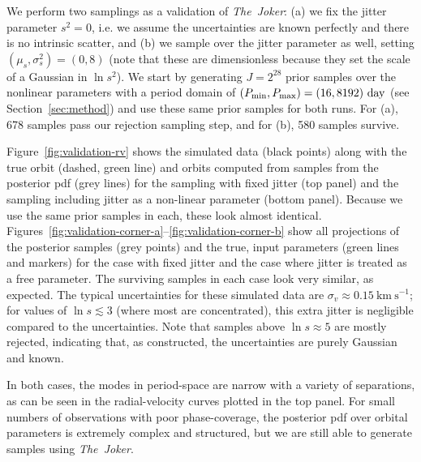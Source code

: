 \documentclass[manuscript, letterpaper]{aastex6}
\newcommand{\project}[1]{\textsl{#1}}
\newcommand{\samplername}{\project{The~Joker}}
\newcommand{\sectionname}{Section}
\newcommand{\figname}{Figure}
\newcommand{\kms}{\mathrm{km}~\mathrm{s}^{-1}}
\begin{document}
We perform two samplings as a validation of \samplername:
(a) we fix the jitter parameter $s^2 = 0$, i.e. we assume the uncertainties are
known perfectly and there is no intrinsic scatter, and (b) we sample over the
jitter parameter as well, setting $(\mu_s,\sigma^2_s) = (0,8)$ (note that these
are dimensionless because they set the scale of a Gaussian in $\ln s^2$).
We start by generating $J=2^{28}$ prior samples over the nonlinear parameters
with a period domain of $(P_{\rm min}, P_{\rm max}) = (16, 8192)~{\rm day}$ (see
\sectionname~\ref{sec:method}) and use these same prior samples for both runs.
For (a), 678 samples pass our rejection sampling step, and for (b), 580 samples
survive.

\figname~\ref{fig:validation-rv} shows the simulated data (black points) along with
the true orbit (dashed, green line) and orbits computed from samples from the
posterior pdf (grey lines) for the sampling with fixed jitter (top panel) and
the sampling including jitter as a non-linear parameter (bottom panel).
Because we use the same prior samples in each, these look almost identical.
\figname s~\ref{fig:validation-corner-a}--\ref{fig:validation-corner-b} show all
projections of the posterior samples (grey points) and the true, input
parameters (green lines and markers) for the case with fixed jitter and the case
where jitter is treated as a free parameter.
The surviving samples in each case look very similar, as expected.
The typical uncertainties for these simulated data are $\sigma_v \approx
0.15~\kms$; for values of $\ln s \lesssim 3$ (where most are concentrated), this
extra jitter is negligible compared to the uncertainties.
Note that samples above $\ln s \approx 5$ are mostly rejected, indicating that,
as constructed, the uncertainties are purely Gaussian and known.

In both cases, the modes in period-space are narrow with a variety of
separations, as can be seen in the radial-velocity curves plotted in the top
panel.
For small numbers of observations with poor phase-coverage, the posterior pdf
over orbital parameters is extremely complex and structured, but we are still
able to generate samples using \samplername.
\end{document}
